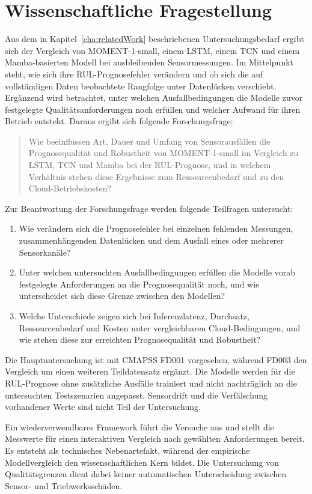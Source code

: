 

\chapter{Wissenschaftliche Fragestellung}\label{cha:researchQuestion}

Aus dem in Kapitel~\ref{cha:relatedWork} beschriebenen Untersuchungsbedarf ergibt sich der Vergleich von MOMENT-1-small, einem \ac{LSTM}, einem \ac{TCN} und einem Mamba-basierten Modell bei ausbleibenden Sensormessungen. Im Mittelpunkt steht, wie sich ihre \ac{RUL}-Prognosefehler verändern und ob sich die auf vollständigen Daten beobachtete Rangfolge unter Datenlücken verschiebt. Ergänzend wird betrachtet, unter welchen Ausfallbedingungen die Modelle zuvor festgelegte Qualitätsanforderungen noch erfüllen und welcher Aufwand für ihren Betrieb entsteht. Daraus ergibt sich folgende Forschungsfrage:

\begin{quote}
	Wie beeinflussen Art, Dauer und Umfang von Sensorausfällen die Prognosequalität und Robustheit von MOMENT-1-small im Vergleich zu \ac{LSTM}, \ac{TCN} und Mamba bei der \ac{RUL}-Prognose, und in welchem Verhältnis stehen diese Ergebnisse zum Ressourcenbedarf und zu den Cloud-Betriebskosten?
\end{quote}

\noindent Zur Beantwortung der Forschungsfrage werden folgende Teilfragen untersucht:

\begin{enumerate}
	\item Wie verändern sich die Prognosefehler bei einzelnen fehlenden Messungen, zusammenhängenden Datenlücken und dem Ausfall eines oder mehrerer Sensorkanäle?
	\item Unter welchen untersuchten Ausfallbedingungen erfüllen die Modelle vorab festgelegte Anforderungen an die Prognosequalität noch, und wie unterscheidet sich diese Grenze zwischen den Modellen?
	\item Welche Unterschiede zeigen sich bei Inferenzlatenz, Durchsatz, Ressourcenbedarf und Kosten unter vergleichbaren Cloud-Bedingungen, und wie stehen diese zur erreichten Prognosequalität und Robustheit?
\end{enumerate}

Die Hauptuntersuchung ist mit \ac{CMAPSS} FD001 vorgesehen, während FD003 den Vergleich um einen weiteren Teildatensatz ergänzt. Die Modelle werden für die \ac{RUL}-Prognose ohne zusätzliche Ausfälle trainiert und nicht nachträglich an die untersuchten Testszenarien angepasst. Sensordrift und die Verfälschung vorhandener Werte sind nicht Teil der Untersuchung.

Ein wiederverwendbares Framework führt die Versuche aus und stellt die Messwerte für einen interaktiven Vergleich nach gewählten Anforderungen bereit. Es entsteht als technisches Nebenartefakt, während der empirische Modellvergleich den wissenschaftlichen Kern bildet. Die Untersuchung von Qualitätsgrenzen dient dabei keiner automatischen Unterscheidung zwischen Sensor- und Triebwerksschäden.
